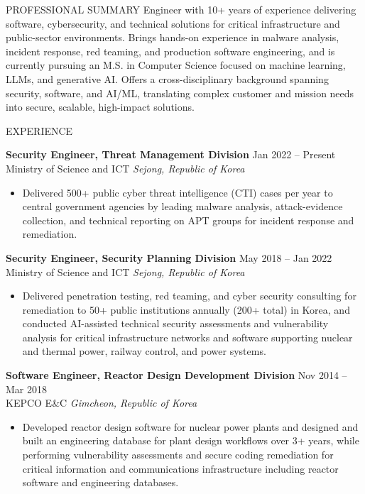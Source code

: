 \documentclass{resume}
\begin{document}
\small

\begin{rSection}{PROFESSIONAL SUMMARY}
Engineer with 10+ years of experience delivering software, cybersecurity, and technical solutions for critical infrastructure and public-sector environments. Brings hands-on experience in malware analysis, incident response, red teaming, and production software engineering, and is currently pursuing an M.S. in Computer Science focused on machine learning, LLMs, and generative AI. Offers a cross-disciplinary background spanning security, software, and AI/ML, translating complex customer and mission needs into secure, scalable, high-impact solutions.
\end{rSection}

\begin{rSection}{EXPERIENCE}

\textbf{Security Engineer, Threat Management Division} \hfill Jan 2022 -- Present\\
Ministry of Science and ICT \hfill \textit{Sejong, Republic of Korea}
\begin{itemize}
    \itemsep -4pt {}
    \item Delivered 500+ public cyber threat intelligence (CTI) cases per year to central government agencies by leading malware analysis, attack-evidence collection, and technical reporting on APT groups for incident response and remediation.
\end{itemize}

\textbf{Security Engineer, Security Planning Division} \hfill May 2018 -- Jan 2022\\
Ministry of Science and ICT \hfill \textit{Sejong, Republic of Korea}
\begin{itemize}
    \itemsep -4pt {}
    \item Delivered penetration testing, red teaming, and cyber security consulting for remediation to 50+ public institutions annually (200+ total) in Korea, and conducted AI-assisted technical security assessments and vulnerability analysis for critical infrastructure networks and software supporting nuclear and thermal power, railway control, and power systems.
\end{itemize}

\textbf{Software Engineer, Reactor Design Development Division} \hfill Nov 2014 -- Mar 2018\\
KEPCO E\&C \hfill \textit{Gimcheon, Republic of Korea}
\begin{itemize}
    \itemsep -4pt {}
    \item Developed reactor design software for nuclear power plants and designed and built an engineering database for plant design workflows over 3+ years, while performing vulnerability assessments and secure coding remediation for critical information and communications infrastructure including reactor software and engineering databases.
\end{itemize}

\end{rSection}
\end{document}
